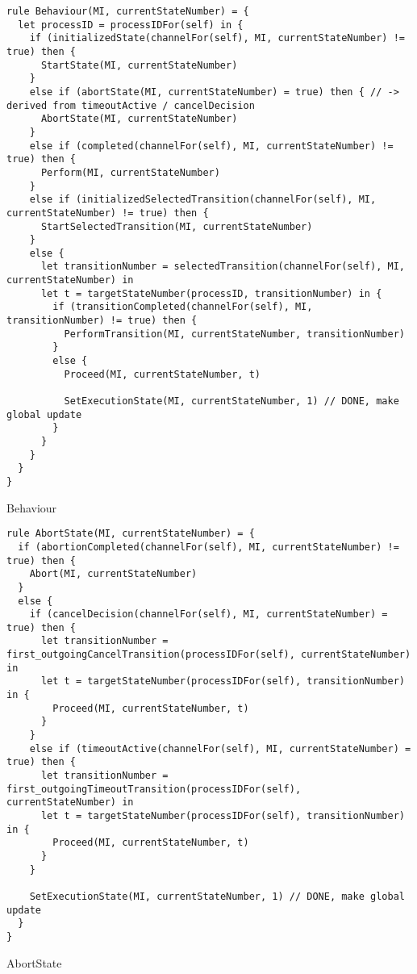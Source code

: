 \begin{listing}[H]
\begin{verbatim}
rule Behaviour(MI, currentStateNumber) = {
  let processID = processIDFor(self) in {
    if (initializedState(channelFor(self), MI, currentStateNumber) != true) then {
      StartState(MI, currentStateNumber)
    }
    else if (abortState(MI, currentStateNumber) = true) then { // -> derived from timeoutActive / cancelDecision
      AbortState(MI, currentStateNumber)
    }
    else if (completed(channelFor(self), MI, currentStateNumber) != true) then {
      Perform(MI, currentStateNumber)
    }
    else if (initializedSelectedTransition(channelFor(self), MI, currentStateNumber) != true) then {
      StartSelectedTransition(MI, currentStateNumber)
    }
    else {
      let transitionNumber = selectedTransition(channelFor(self), MI, currentStateNumber) in
      let t = targetStateNumber(processID, transitionNumber) in {
        if (transitionCompleted(channelFor(self), MI, transitionNumber) != true) then {
          PerformTransition(MI, currentStateNumber, transitionNumber)
        }
        else {
          Proceed(MI, currentStateNumber, t)

          SetExecutionState(MI, currentStateNumber, 1) // DONE, make global update
        }
      }
    }
  }
}
\end{verbatim}
\caption{Behaviour}
\label{lst:asm:Behaviour}
\end{listing}




\begin{listing}[H]
\begin{verbatim}
rule AbortState(MI, currentStateNumber) = {
  if (abortionCompleted(channelFor(self), MI, currentStateNumber) != true) then {
    Abort(MI, currentStateNumber)
  }
  else {
    if (cancelDecision(channelFor(self), MI, currentStateNumber) = true) then {
      let transitionNumber = first_outgoingCancelTransition(processIDFor(self), currentStateNumber) in
      let t = targetStateNumber(processIDFor(self), transitionNumber) in {
        Proceed(MI, currentStateNumber, t)
      }
    }
    else if (timeoutActive(channelFor(self), MI, currentStateNumber) = true) then {
      let transitionNumber = first_outgoingTimeoutTransition(processIDFor(self), currentStateNumber) in
      let t = targetStateNumber(processIDFor(self), transitionNumber) in {
        Proceed(MI, currentStateNumber, t)
      }
    }

    SetExecutionState(MI, currentStateNumber, 1) // DONE, make global update
  }
}
\end{verbatim}
\caption{AbortState}
\label{lst:asm:AbortState}
\end{listing}




